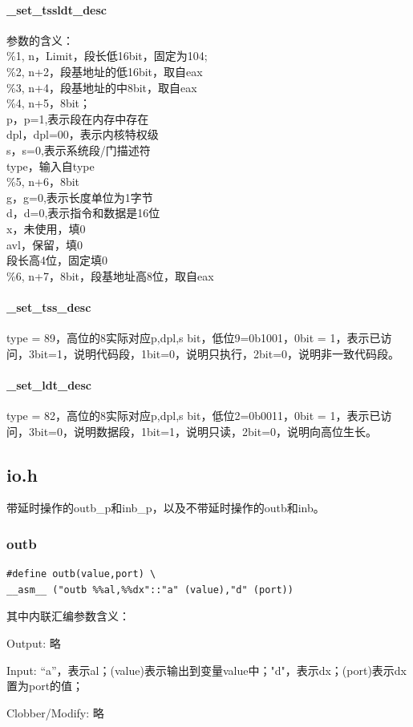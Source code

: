 \documentclass[12pt]{article}
\begin{document}
\paragraph{\_set\_tssldt\_desc}	
参数的含义：\\
\%1, n，Limit，段长低16bit，固定为104;\\
\%2, n+2，段基地址的低16bit，取自eax\\
\%3, n+4，段基地址的中8bit，取自eax\\
\%4, n+5，8bit；\\
p，p=1,表示段在内存中存在\\
dpl，dpl=00，表示内核特权级\\
s，s=0,表示系统段/门描述符\\
type，输入自type\\
\%5, n+6，8bit\\
g，g=0,表示长度单位为1字节\\
d，d=0,表示指令和数据是16位\\
x，未使用，填0\\
avl，保留，填0\\
段长高4位，固定填0\\
\%6, n+7，8bit，段基地址高8位，取自eax\\
\paragraph{\_set\_tss\_desc}	
type = 89，高位的8实际对应p,dpl,s bit，低位9=0b1001，0bit = 1，表示已访问，3bit=1，说明代码段，1bit=0，说明只执行，2bit=0，说明非一致代码段。
\paragraph{\_set\_ldt\_desc}	
type = 82，高位的8实际对应p,dpl,s bit，低位2=0b0011，0bit = 1，表示已访问，3bit=0，说明数据段，1bit=1，说明只读，2bit=0，说明向高位生长。

\subsection{io.h}
带延时操作的outb\_p和inb\_p，以及不带延时操作的outb和inb。
\subsubsection{outb}	
\begin{lstlisting}[breaklines]
#define outb(value,port) \
__asm__ ("outb %%al,%%dx"::"a" (value),"d" (port))
\end{lstlisting}
其中内联汇编参数含义：
\begin{list}{•}{•}
\item Output: 略
\item Input: “a”，表示al；(value)表示输出到变量value中；"d"，表示dx；(port)表示dx置为port的值；
\item Clobber/Modify: 略
\end{list}
\end{document}
